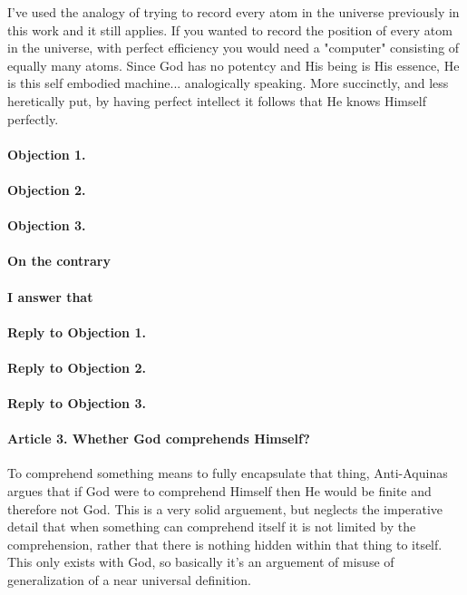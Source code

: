 \documentclass{ucetd}
\begin{document}
I've used the analogy of trying to record every atom in the universe previously in this work and it still applies. If you wanted to record the position of every atom in the universe, with perfect efficiency you would need a "computer" consisting of equally many atoms. Since God has no potentcy and His being is His essence, He is this self embodied machine... analogically speaking. More succinctly, and less heretically put, by having perfect intellect it follows that He knows Himself perfectly.

\paragraph{Objection 1.}
\paragraph{Objection 2.}
\paragraph{Objection 3.}
\paragraph{On the contrary}
\paragraph{I answer that}
\paragraph{Reply to Objection 1.}
\paragraph{Reply to Objection 2.}
\paragraph{Reply to Objection 3.}

\paragraph{Article 3. Whether God comprehends Himself?}
To comprehend something means to fully encapsulate that thing, Anti-Aquinas argues that if God were to comprehend Himself then He would be finite and therefore not God. This is a very solid arguement, but neglects the imperative detail that when something can comprehend itself it is not limited by the comprehension, rather that there is nothing hidden within that thing to itself. This only exists with God, so basically it's an arguement of misuse of generalization of a near universal definition.
\end{document}
